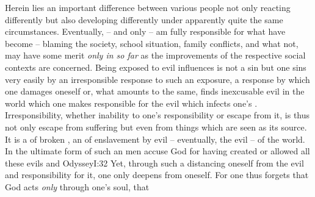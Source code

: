 Herein lies an important difference between various people not only reacting
differently but also developing differently under apparently quite the same
circumstances. Eventually,  -- and only  -- am fully responsible for
what  have become -- blaming the society, school situation, family
conflicts, and what not, may have some merit {\em only in so far} as the
 improvements of the respective social contexts are concerned.
Being exposed to evil influences is not a sin but one sins very easily by an
irresponsible response to such an exposure, a response by which one damages
oneself or, what amounts to the same, finds inexcusable evil in the world which
one makes responsible for the evil which infects one's .
Irresponsibility, whether inability to  one's responsibility or
escape from it, is thus not only escape from suffering but even from things
which are seen as its source.  It is a  of broken , an
 of enslavement by evil -- eventually, the  evil -- of
the world. In the ultimate form of such an  men accuse God for
having created or allowed all these evils and \citet{lay blame upon [...] gods
  for what is after all nothing but their own folly.}{Odyssey}{I:32} Yet,
through such a distancing oneself from the evil and responsibility for it, one
only deepens  from oneself. For one thus forgets that God acts
{\em only} through one's soul, that 


